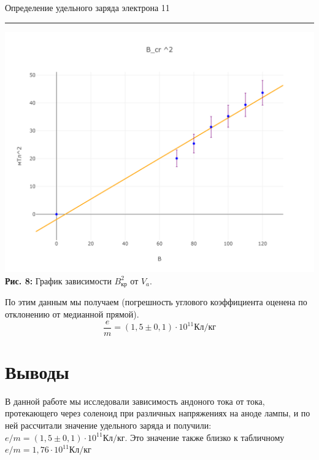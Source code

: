 \documentclass[12pt,a4paper]{scrartcl}
\begin{document}
	\begin{flushleft}
		\footnotesize{Определение удельного заряда электрона} \hspace{\fill} \footnotesize{11}
		\\[-0.3cm]\noindent\rule{\textwidth}{0.3pt}
	\end{flushleft}

\begin{center}
\includegraphics[scale=0.13]{PIC_8.png}\\
\textbf{Рис. 8:} График зависимости $B_{\text{кр}}^2$ от $V_a$.
\end{center}

 По этим данным мы получаем (погрешность углового коэффициента оценена по отклонению от медианной прямой). 
\[\dfrac{e}{m} = (1,5 \pm 0,1) \cdot 10^{11} \text{Кл}/\text{кг}\]

\section{Выводы}

В данной работе мы исследовали зависимость андоного тока от тока, протекающего через соленоид при различных напряжениях на аноде лампы, и по ней рассчитали значение удельного заряда и получили: $e/m = (1,5 \pm 0,1) \cdot 10^{11} \text{Кл}/\text{кг}$. Это значение также близко к табличному $e/m = 1,76 \cdot 10^{11} \text{Кл}/\text{кг}$
\end{document}
